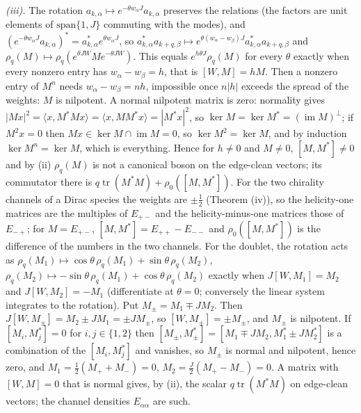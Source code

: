 \emph{(iii).} The rotation $a_{k,\alpha} \mapsto e^{-\theta w_{\alpha}J}a_{k,\alpha}$ preserves the relations (the factors are unit elements of $\mathrm{span}\{1, J\}$ commuting with the modes), and $(e^{-\theta w_{\alpha}J}a_{k,\alpha})^{*} = a_{k,\alpha}^{*}e^{\theta w_{\alpha}J}$, so $a_{k,\alpha}^{*}a_{k+q,\beta} \mapsto e^{\theta(w_{\alpha} - w_{\beta})J}a_{k,\alpha}^{*}a_{k+q,\beta}$ and $\rho_{q}(M) \mapsto \rho_{q}(e^{\theta JW}Me^{-\theta JW})$. This equals $e^{h\theta J}\rho_{q}(M)$ for every $\theta$ exactly when every nonzero entry has $w_{\alpha} - w_{\beta} = h$, that is $[W, M] = hM$. Then a nonzero entry of $M^{n}$ needs $w_{\alpha} - w_{\beta} = nh$, impossible once $n|h|$ exceeds the spread of the weights: $M$ is nilpotent. A normal nilpotent matrix is zero: normality gives $|Mx|^{2} = \langle x, M^{*}Mx\rangle = \langle x, MM^{*}x\rangle = |M^{*}x|^{2}$, so $\ker M = \ker M^{*} = (\operatorname{im}M)^{\perp}$; if $M^{2}x = 0$ then $Mx \in \ker M \cap \operatorname{im}M = 0$, so $\ker M^{2} = \ker M$, and by induction $\ker M^{n} = \ker M$, which is everything. Hence for $h \ne 0$ and $M \ne 0$, $[M, M^{*}] \ne 0$ and by (ii) $\rho_{q}(M)$ is not a canonical boson on the edge-clean vectors; its commutator there is $q\operatorname{tr}(M^{*}M) + \rho_{0}([M, M^{*}])$. For the two chirality channels of a Dirac species the weights are $\pm\tfrac12$ (Theorem (iv)), so the helicity-one matrices are the multiples of $E_{+-}$ and the helicity-minus-one matrices those of $E_{-+}$; for $M = E_{+-}$, $[M, M^{*}] = E_{++} - E_{--}$ and $\rho_{0}([M, M^{*}])$ is the difference of the numbers in the two channels.
For the doublet, the rotation acts as $\rho_{q}(M_{1}) \mapsto \cos\theta\,\rho_{q}(M_{1}) + \sin\theta\,\rho_{q}(M_{2})$, $\rho_{q}(M_{2}) \mapsto -\sin\theta\,\rho_{q}(M_{1}) + \cos\theta\,\rho_{q}(M_{2})$ exactly when $J[W, M_{1}] = M_{2}$ and $J[W, M_{2}] = -M_{1}$ (differentiate at $\theta = 0$; conversely the linear system integrates to the rotation). Put $M_{\pm} = M_{1} \mp JM_{2}$. Then $J[W, M_{\pm}] = M_{2} \pm JM_{1} = \pm J M_{\pm}$, so $[W, M_{\pm}] = \pm M_{\pm}$, and $M_{\pm}$ is nilpotent. If $[M_{i}, M_{j}^{*}] = 0$ for $i, j \in \{1, 2\}$ then $[M_{\pm}, M_{\pm}^{*}] = [M_{1} \mp JM_{2}, M_{1}^{*} \pm JM_{2}^{*}]$ is a combination of the $[M_{i}, M_{j}^{*}]$ and vanishes, so $M_{\pm}$ is normal and nilpotent, hence zero, and $M_{1} = \tfrac12(M_{+} + M_{-}) = 0$, $M_{2} = \tfrac{J}{2}(M_{+} - M_{-}) = 0$.
A matrix with $[W, M] = 0$ that is normal gives, by (ii), the scalar $q\operatorname{tr}(M^{*}M)$ on edge-clean vectors; the channel densities $E_{\alpha\alpha}$ are such.

